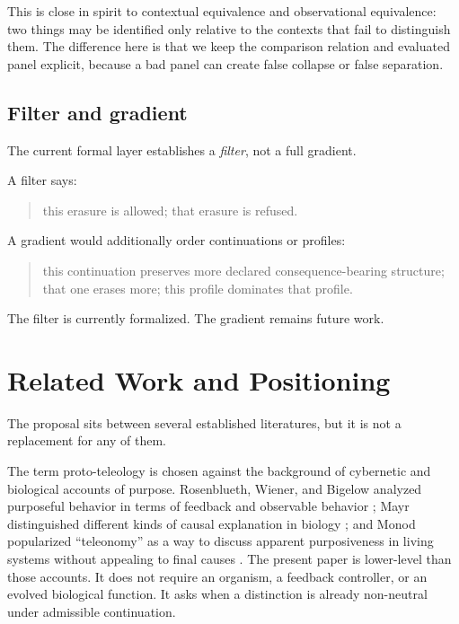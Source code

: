 \documentclass[11pt]{article}
\begin{document}
This is close in spirit to contextual equivalence and observational
equivalence: two things may be identified only relative to the contexts that
fail to distinguish them. The difference here is that we keep the comparison
relation and evaluated panel explicit, because a bad panel can create false
collapse or false separation.

\subsection{Filter and gradient}

The current formal layer establishes a \emph{filter}, not a full gradient.

A filter says:

\begin{quote}
this erasure is allowed; that erasure is refused.
\end{quote}

A gradient would additionally order continuations or profiles:

\begin{quote}
this continuation preserves more declared consequence-bearing structure; that
one erases more; this profile dominates that profile.
\end{quote}

The filter is currently formalized. The gradient remains future work.

\section{Related Work and Positioning}

The proposal sits between several established literatures, but it is not a
replacement for any of them.

The term proto-teleology is chosen against the background of cybernetic and
biological accounts of purpose. Rosenblueth, Wiener, and Bigelow analyzed
purposeful behavior in terms of feedback and observable behavior
\cite{rosenblueth1943behavior}; Mayr distinguished different kinds of causal
explanation in biology \cite{mayr1961cause}; and Monod popularized
``teleonomy'' as a way to discuss apparent purposiveness in living systems
without appealing to final causes \cite{monod1971chance}. The present paper is
lower-level than those accounts. It does not require an organism, a feedback
controller, or an evolved biological function. It asks when a distinction is
already non-neutral under admissible continuation.
\end{document}

